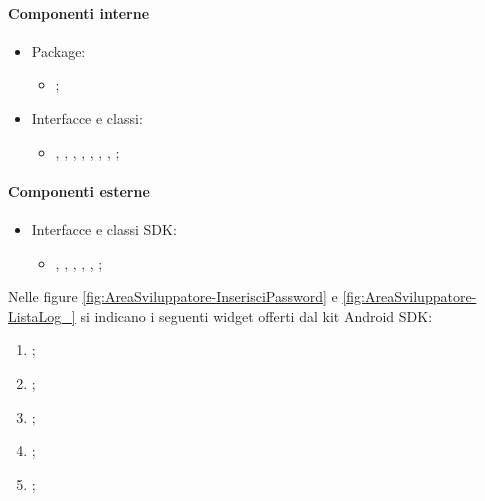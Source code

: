 \documentclass[../Funzionalita.tex]{subfiles}
\begin{document}
			\paragraph*{Componenti interne}
			\begin{itemize}
			
				\item Package:
				\begin{itemize}
					\item[] \view;
				\end{itemize}
				
				\item Interfacce e classi:
				\begin{itemize}
					\item[] \MainDeveloperViewImp, 
					\MainDeveloperView, \DeveloperUnlockerViewImp, \DeveloperUnlockerView, 
					\LoggingViewImp, \LoggingView, 
					\LogInformationViewImp, \LogInformationView;
				\end{itemize}
				
			\end{itemize}
			
			
			\paragraph*{Componenti esterne}
			\begin{itemize}
				\item Interfacce e classi SDK:
				\begin{itemize}
					\item[] \EditText, \Button, \FloatingActionButton, \ListView, \TextView, \Toolbar;
				\end{itemize}
			\end{itemize}
			
			
			Nelle figure \ref{fig:AreaSviluppatore-InserisciPassword} e \ref{fig:AreaSviluppatore-ListaLog_} si indicano i seguenti widget offerti dal kit \gls{Android} SDK:
			\begin{enumerate}
				\item \EditText;
				\item \Button;
				\item \Toolbar;
				\item \ListView;
				\item \FloatingActionButton;
			\end{enumerate}
			
\end{document}

